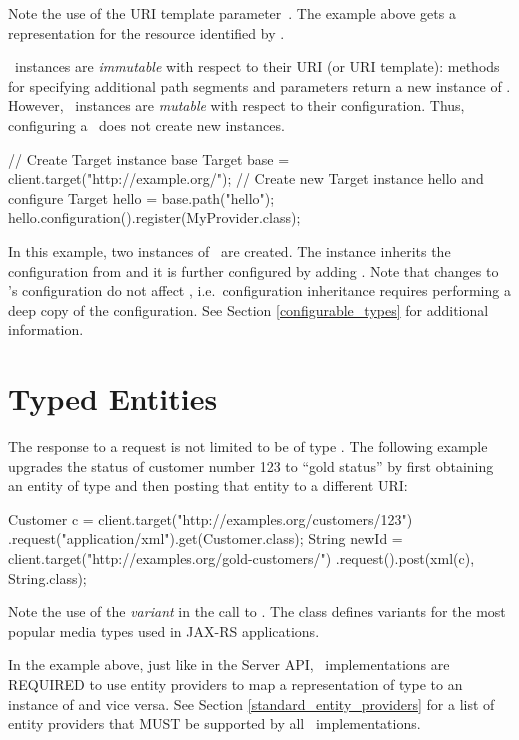 Note the use of the URI template parameter~. The example above gets a representation for the resource identified by .

\Target\ instances are {\em immutable} with respect to their URI (or URI template): methods for specifying additional path segments and parameters return a new instance of \Target. However, \Target\ instances are {\em mutable} with respect to their configuration. Thus, configuring a \Target\ does not create new instances.

\begin{listing}{1}
// Create Target instance base
Target base = client.target("http://example.org/");
// Create new Target instance hello and configure
Target hello = base.path("hello");
hello.configuration().register(MyProvider.class);
\end{listing}

In this example, two instances of \Target\ are created. The instance  inherits the configuration from  and it is further configured by adding . Note that changes to 's configuration do not affect , i.e.~configuration inheritance requires performing a deep copy of the configuration. See Section \ref{configurable_types} for additional information.

\section{Typed Entities}

The response to a request is not limited to be of type \Response. The following example upgrades the status of customer number 123 to ``gold status'' by first obtaining an entity of type  and then posting that entity to a different URI:

\begin{listing}{1}
Customer c = client.target("http://examples.org/customers/123")
    .request("application/xml").get(Customer.class);
String newId = client.target("http://examples.org/gold-customers/")
    .request().post(xml(c), String.class);
\end{listing}

Note the use of the {\em variant}  in the call to . The class  defines variants for the most popular media types used in JAX-RS applications.

In the example above, just like in the Server API, \jaxrs\ implementations are REQUIRED to use entity providers to map a representation of type  to an instance of  and vice versa. See Section \ref{standard_entity_providers} for a list of entity providers that MUST be supported by all \jaxrs\ implementations.

